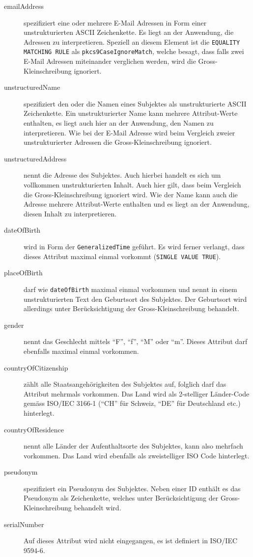 \documentclass[10pt,a4paper]{article}
\begin{document}
\begin{description}
    \item[emailAddress] spezifiziert eine oder mehrere E-Mail Adressen in Form einer
        unstrukturierten ASCII Zeichenkette. Es liegt an der Anwendung, die Adressen zu
        interpretieren. Speziell an diesem Element ist die \texttt{EQUALITY MATCHING RULE}
        als \texttt{pkcs9CaseIgnoreMatch}, welche besagt, dass falls zwei E-Mail Adressen
        miteinander verglichen werden, wird die Gross-Kleinschreibung ignoriert.
    \item[unstructuredName] spezifiziert den oder die Namen eines Subjektes als
        unstrukturierte ASCII Zeichenkette. Ein unstrukturierter Name kann mehrere
        Attribut-Werte enthalten, es liegt auch hier an der Anwendung, den Namen zu
        interpretieren. Wie bei der E-Mail Adresse wird beim Vergleich zweier
        unstrukturierter Adressen die Gross-Kleinschreibung ignoriert.
    \item[unstructuredAddress] nennt die Adresse des Subjektes. Auch hierbei handelt es
        sich um vollkommen unstrukturierten Inhalt. Auch hier gilt, dass beim Vergleich
        die Gross-Kleinschreibung ignoriert wird. Wie der Name kann auch die Adresse
        mehrere Attribut-Werte enthalten und es liegt an der Anwendung, diesen Inhalt zu
        interpretieren.
    \item[dateOfBirth] wird in Form der \texttt{GeneralizedTime} geführt. Es wird ferner
        verlangt, dass dieses Attribut maximal einmal vorkommt (\texttt{SINGLE VALUE
        TRUE}).
    \item[placeOfBirth] darf wie \texttt{dateOfBirth} maximal einmal vorkommen und nennt
        in einem unstrukturierten Text den Geburtsort des Subjektes. Der Geburtsort wird
        allerdings unter Berücksichtigung der Gross-Kleinschreibung behandelt.
    \item[gender] nennt das Geschlecht mittels "`F"', "`f"', "`M"' oder "`m"'. Dieses
        Attribut darf ebenfalls maximal einmal vorkommen.
    \item[countryOfCitizenship] zählt alle Staatsangehörigkeiten des Subjektes auf,
        folglich darf das Attribut mehrmals vorkommen. Das Land wird als 2-stelliger
        Länder-Code gemäss ISO/IEC 3166-1 ("`CH"' für Schweiz, "`DE"' für Deutschland
        etc.) hinterlegt.
    \item[countryOfResidence] nennt alle Länder der Aufenthaltsorte des Subjektes, kann
        also mehrfach vorkommen. Das Land wird ebenfalls als zweistelliger ISO Code
        hinterlegt.
    \item[pseudonym] spezifiziert ein Pseudonym des Subjektes. Neben einer ID enthält es
        das Pseudonym als Zeichenkette, welches unter Berücksichtigung der
        Gross-Kleinschreibung behandelt wird.
    \item[serialNumber] Auf dieses Attribut wird nicht eingegangen, es ist definiert in
        ISO/IEC 9594-6.
\end{description}
\end{document}
